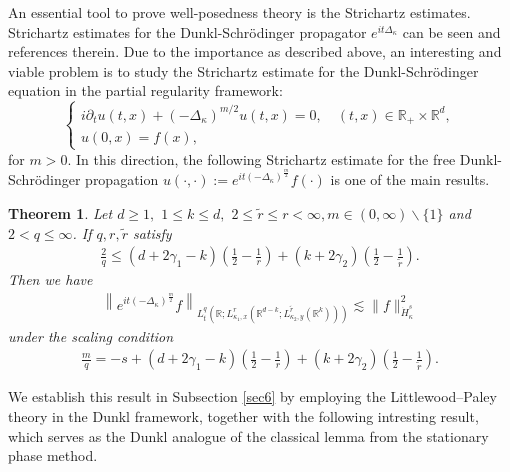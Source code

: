 \documentclass[a4paper,11pt, reqno]{amsart}
\newtheorem{theorem}{Theorem}[section]
\theoremstyle{definition}
\theoremstyle{remark}
\numberwithin{equation}{section}
\begin{document}
    
    An essential tool to prove well-posedness theory is the Strichartz estimates. Strichartz estimates for the Dunkl-Schr\"{o}dinger propagator $e^{it\Delta_\kappa}$ can be seen   \cite{Mejjaoli2009, shyam} and references therein. Due to the importance as described above,  an interesting and viable problem
	is to study the Strichartz estimate for the Dunkl-Schr\"odinger equation in the partial regularity framework: 
    \begin{equation*}
		\begin{cases}
			i\partial_t u(t, x) + (-\Delta_\kappa)^{m/2} u(t, x)= 0, \quad (t, x) \in \mathbb{R}_+ \times \mathbb{R}^d, \\
			u(0, x)=f(x),
		\end{cases}
	\end{equation*} for $m>0.$
    In this direction, the following Strichartz estimate for the free Dunkl-Schr\"odinger propagation $u(\cdot, \cdot ):=e^{i t(-\Delta_\kappa)^{\frac{m}{2}}} f(\cdot)$ is one of the main results. 
	\begin{theorem} \label{Dunklshrodintro}
		Let $d\geq 1,$ $1 \leq k \leq d,$ $  2 \leq \widetilde{r} \leq r<\infty , m\in (0, \infty)\backslash \{1\} $  and $ 2<q \leq \infty$. If $ q, r, \tilde{r}$ satisfy 
		\begin{align*}
			\frac{2}{q} \leq(d+2\gamma_1-k)\left(\frac{1}{2}-\frac{1}{r}\right)+(k+2\gamma_2)\left(\frac{1}{2}-\frac{1}{\widetilde{r}}\right). 
		\end{align*}
		Then we have
		\begin{align*}
			\left\|e^{i t(-\Delta_\kappa)^{\frac{m}{2}}} f\right\|_{L_t^q\left(\mathbb{R} ; L_{{ \kappa_1},x}^r\left(\mathbb{R}^{d-k} ; L_{{ \kappa_2},y}^{\tilde{r}}\left(\mathbb{R}^k\right)\right)\right)} \lesssim\|f\|_{\dot{H}_{\kappa}^s}^2
		\end{align*}
		under the scaling condition
		\begin{align*} 
			\frac{{{m}}}{q}=-s +(d+2\gamma_1-k)\left(\frac{1}{2}-\frac{1}{r}\right)+(k+2\gamma_2)\left(\frac{1}{2}-\frac{1}{\widetilde{r}}\right).
		\end{align*}
	\end{theorem}   
	We establish this result in Subsection \ref{sec6} by employing the Littlewood–Paley theory in the Dunkl framework, together with the following intresting result, which serves as the Dunkl analogue of the classical lemma from the stationary phase method. 
\end{document}
